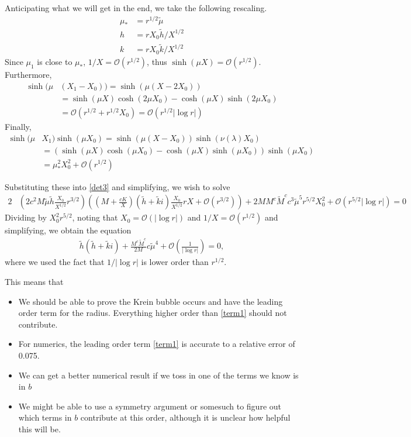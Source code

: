 \documentclass[10pt,reqno]{amsart}
\theoremstyle{plain}
\theoremstyle{definition}
\theoremstyle{remark}
\numberwithin{theorem}{section}
\numberwithin{equation}{section}
\begin{document}
Anticipating what we will get in the end, we take the following rescaling.
\begin{align*}
\mu_* &= r^{1/2} \tilde{\mu} \\
h &= r X_0 \tilde{h} / X^{1/2} \\
k &= r X_0 \tilde{k} / X^{1/2}
\end{align*}
Since $\mu_1$ is close to $\mu_*$, $1/X = \mathcal{O}(r^{1/2})$, thus $\sinh(\mu X) =  \mathcal{O}(r^{1/2})$. Furthermore, 
\begin{align*}
\sinh(\mu&(X_1 - X_0)) = \sinh(\mu(X - 2 X_0)) \\
&= \sinh(\mu X) \cosh(2 \mu X_0)  - \cosh(\mu X)\sinh(2 \mu X_0) \\
&= \mathcal{O}\left( r^{1/2} + r^{1/2} X_0 \right) 
= \mathcal{O}\left( r^{1/2}|\log r| \right) 
\end{align*}
Finally, 
\begin{align*}
\sinh(\mu &X_1)\sinh(\mu X_0) = \sinh(\mu ( X - X_0 )) \sinh(\nu(\lambda)X_0) \\
&= \left( \sinh(\mu X) \cosh( \mu X_0)  - \cosh(\mu X)\sinh(\mu X_0) \right)\sinh(\mu X_0) \\
&= \mu_*^2 X_0^2 + \mathcal{O}(r^{1/2})
\end{align*}

Substituting these into \cref{det3} and simplifying, we wish to solve
\begin{equation}\label{det4}
\begin{aligned}
2 &\left( 2 c^2 M \tilde{\mu} \tilde{h} \frac{X_0}{X^{1/2}} r^{3/2} \right) 
\left( \left( M + \frac{c K}{X} \right) ( \tilde{h}+ \tilde{k} i) \frac{X_0}{X^{1/2}} r X + \mathcal{O}(r^{3/2}) \right) 
+ 2 M M^c \tilde{M}^c c^3 \tilde{\mu}^5 r^{5/2} X_0^2 + \mathcal{O}( r^{5/2} |\log r| ) = 0
\end{aligned}
\end{equation}
Dividing by $X_0^2 r^{5/2}$, noting that $X_0 = \mathcal{O}(|\log r|)$ and $1/X = \mathcal{O}(r^{1/2})$ and simplifying, we obtain the equation
\begin{equation}\label{det5}
\begin{aligned}
\tilde{h} ( \tilde{h}+ \tilde{k} i) 
+ \frac{M^c \tilde{M}^c }{2 M} c \tilde{\mu}^4 + \mathcal{O}\left( \frac{1}{|\log r|} \right) = 0,
\end{aligned}
\end{equation}
where we used the fact that $1/|\log r|$ is lower order than $r^{1/2}$. 

This means that
\begin{itemize}
	\item We should be able to prove the Krein bubble occurs and have the leading order term for the radius. Everything higher order than \cref{term1} should not contribute.
	\item For numerics, the leading order term \cref{term1} is accurate to a relative error of 0.075.
	\item We can get a better numerical result if we toss in one of the terms we know is in $b$
	\item We might be able to use a symmetry argument or somesuch to figure out which terms in $b$ contribute at this order, although it is unclear how helpful this will be.
\end{itemize}
\end{document}
